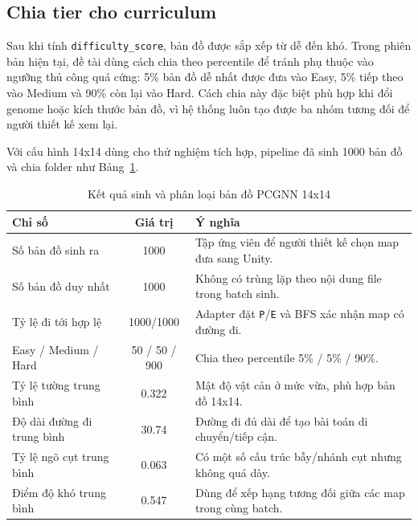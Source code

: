 \subsection{Chia tier cho curriculum}

Sau khi tính \texttt{difficulty\_score}, bản đồ được sắp xếp từ dễ đến khó. Trong phiên bản hiện tại, đề tài dùng cách chia theo percentile để tránh phụ thuộc vào ngưỡng thủ công quá cứng: 5\% bản đồ dễ nhất được đưa vào Easy, 5\% tiếp theo vào Medium và 90\% còn lại vào Hard. Cách chia này đặc biệt phù hợp khi đổi genome hoặc kích thước bản đồ, vì hệ thống luôn tạo được ba nhóm tương đối để người thiết kế xem lại.

Với cấu hình 14x14 dùng cho thử nghiệm tích hợp, pipeline đã sinh 1000 bản đồ và chia folder như Bảng~\ref{tab:pcgnn_map_generation_summary}.

\begin{table}[H]
    \centering
    \small
    \caption{Kết quả sinh và phân loại bản đồ PCGNN 14x14}
    \label{tab:pcgnn_map_generation_summary}
    \begin{tabular}{|p{5cm}|c|p{6.7cm}|}
        \hline
        \textbf{Chỉ số} & \textbf{Giá trị} & \textbf{Ý nghĩa} \\
        \hline
        Số bản đồ sinh ra & 1000 & Tập ứng viên để người thiết kế chọn map đưa sang Unity. \\
        \hline
        Số bản đồ duy nhất & 1000 & Không có trùng lặp theo nội dung file trong batch sinh. \\
        \hline
        Tỷ lệ đi tới hợp lệ & 1000/1000 & Adapter đặt \texttt{P}/\texttt{E} và BFS xác nhận map có đường đi. \\
        \hline
        Easy / Medium / Hard & 50 / 50 / 900 & Chia theo percentile 5\% / 5\% / 90\%. \\
        \hline
        Tỷ lệ tường trung bình & 0.322 & Mật độ vật cản ở mức vừa, phù hợp bản đồ 14x14. \\
        \hline
        Độ dài đường đi trung bình & 30.74 & Đường đi đủ dài để tạo bài toán di chuyển/tiếp cận. \\
        \hline
        Tỷ lệ ngõ cụt trung bình & 0.063 & Có một số cấu trúc bẫy/nhánh cụt nhưng không quá dày. \\
        \hline
        Điểm độ khó trung bình & 0.547 & Dùng để xếp hạng tương đối giữa các map trong cùng batch. \\
        \hline
    \end{tabular}
\end{table}

